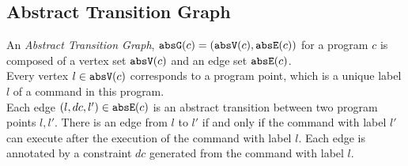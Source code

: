 \subsection{Abstract Transition Graph}
\label{sec:abs_prog}
An \emph{Abstract Transition Graph}, $\mathtt{abs}{\mathtt{G}}(c) =(\mathtt{abs}{\mathtt{V}}(c), \mathtt{abs}{\mathtt{E}}(c))$ for a program $c$ is composed of
a vertex set $\mathtt{abs}{\mathtt{V}}(c)$ and an edge set $\mathtt{abs}{\mathtt{E}}(c)$.
%
\\
Every 
vertex $l \in \mathtt{abs}{\mathtt{V}}(c)$ corresponds to a program point, which is a unique
label $l$ of a command in this program.
\\
Each edge $(l, dc, l') \in \mathtt{abs}{\mathtt{E}}(c)$ is an abstract transition
between two program points $l, l'$. There is an edge from $l$ to $l'$ if and only if
the command with label $l'$ can execute after the execution of the command with label $l$.
Each edge is annotated by a constraint $dc$ generated from the command with label $l$.
